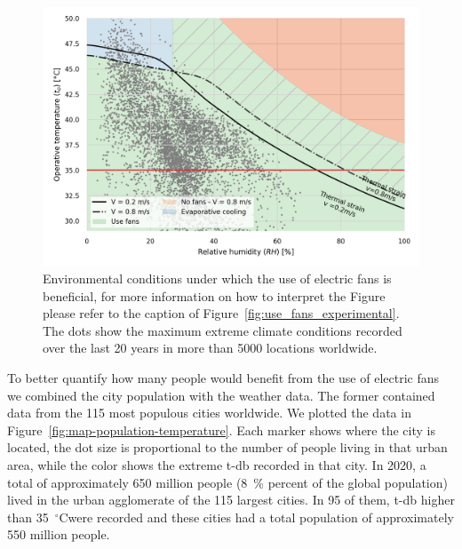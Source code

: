 \begin{figure}[thb!]
    \centering
    \includegraphics[width=\textwidth]{figures/use_fans}
    \caption{Environmental conditions under which the use of electric fans is beneficial, for more information on how to interpret the Figure please refer to the caption of Figure~\ref{fig:use_fans_experimental}.
    The dots show the maximum extreme climate conditions recorded over the last 20 years in more than 5000 locations worldwide.}
    \label{fig:energy_storage_delta}
\end{figure}


To better quantify how many people would benefit from the use of electric fans we combined the city population with the weather data.
The former contained data from the 115 most populous cities worldwide.
We plotted the data in Figure~\ref{fig:map-population-temperature}.
Each marker shows where the city is located, the dot size is proportional to the number of people living in that urban area, while the color shows the extreme \ac{t-db} recorded in that city.
In 2020, a total of approximately 650 million people (8~\% percent of the global population) lived in the urban agglomerate of the 115 largest cities.
In 95 of them, \ac{t-db} higher than 35~$^{\circ}$C\@ were recorded and these cities had a total population of approximately 550 million people.

